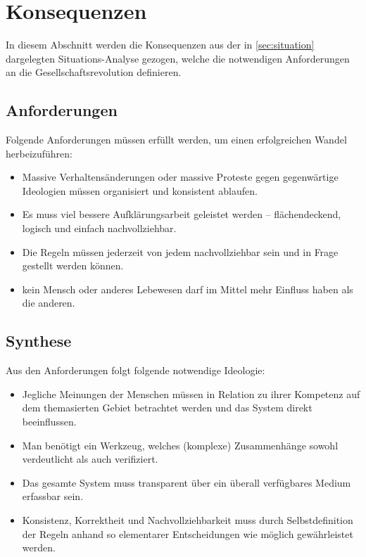 \section{Konsequenzen}\label{sec:consequences}

In diesem Abschnitt werden die Konsequenzen aus der in \vref{sec:situation} dargelegten Situations-Analyse gezogen, welche die notwendigen Anforderungen an die Gesellschaftsrevolution definieren.

\subsection{Anforderungen}\label{sec:consequences/requirements}

Folgende Anforderungen müssen erfüllt werden, um einen erfolgreichen Wandel herbeizuführen:
\begin{itemize}
\item Massive Verhaltensänderungen oder massive Proteste gegen gegenwärtige Ideologien müssen organisiert und konsistent ablaufen.
\item Es muss viel bessere Aufklärungsarbeit geleistet werden -- flächendeckend, logisch und einfach nachvollziehbar.
\item Die Regeln müssen jederzeit von jedem nachvollziehbar sein und in Frage gestellt werden können.
\item kein Mensch oder anderes Lebewesen darf im Mittel mehr Einfluss haben als die anderen.
\end{itemize}

\subsection{Synthese}\label{sec:consequences/synthesis}

Aus den Anforderungen folgt folgende notwendige Ideologie:
\begin{itemize}
\item Jegliche Meinungen der Menschen müssen in Relation zu ihrer Kompetenz auf dem themasierten Gebiet betrachtet werden und das System direkt beeinflussen.
\item Man benötigt ein Werkzeug, welches (komplexe) Zusammenhänge sowohl verdeutlicht als auch verifiziert.
\item Das gesamte System muss transparent über ein überall verfügbares Medium erfassbar sein.
\item Konsistenz, Korrektheit und Nachvollziehbarkeit muss durch Selbstdefinition der Regeln anhand so elementarer Entscheidungen wie möglich gewährleistet werden. 
\end{itemize}

